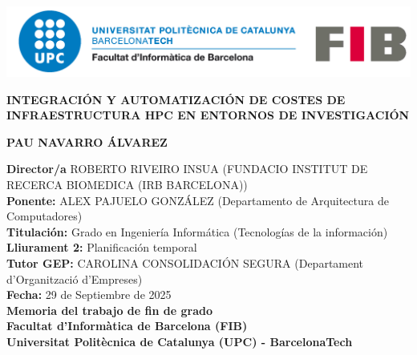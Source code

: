 \begin{titlepage}
\begin{center}
    \includegraphics[width=1\linewidth]{extra/figures/logo-upc-fib.png}
    \vspace{30mm}

    \LARGE{\textsc{\textbf{{INTEGRACIÓN Y AUTOMATIZACIÓN DE COSTES DE INFRAESTRUCTURA HPC EN ENTORNOS DE INVESTIGACIÓN}}}} \\
    \vspace{25mm}
      
        
    \textbf{\Large{\textsc{PAU NAVARRO ÁLVAREZ}}} \\
    \vspace{20mm}
        
    
    
    \large{\textbf{Director/a} ROBERTO RIVEIRO INSUA (FUNDACIO INSTITUT DE RECERCA BIOMEDICA (IRB BARCELONA))} \\
    \large{\textbf{Ponente:} ALEX PAJUELO GONZÁLEZ (Departamento de Arquitectura de Computadores)} \\
    \large{\textbf{Titulación:} Grado en Ingeniería Informática (Tecnologías de la información)} \\
    
    \large{\textbf{Lliurament 2:} }Planificación temporal \\
    \large{\textbf{Tutor GEP:} CAROLINA CONSOLIDACIÓN SEGURA (Departament d'Organització d'Empreses)} \\
    \large{\textbf{Fecha:}} 29 de Septiembre de 2025\\

    \textbf{\large{Memoria del trabajo de fin de grado}} \\
    \vspace{3mm}
    \textbf{\large{Facultat d'Informàtica de Barcelona (FIB)}} \\
    \vspace{3mm}
    \textbf{\large{Universitat Politècnica de Catalunya (UPC) - BarcelonaTech}} \\

\end{center}
\end{titlepage}